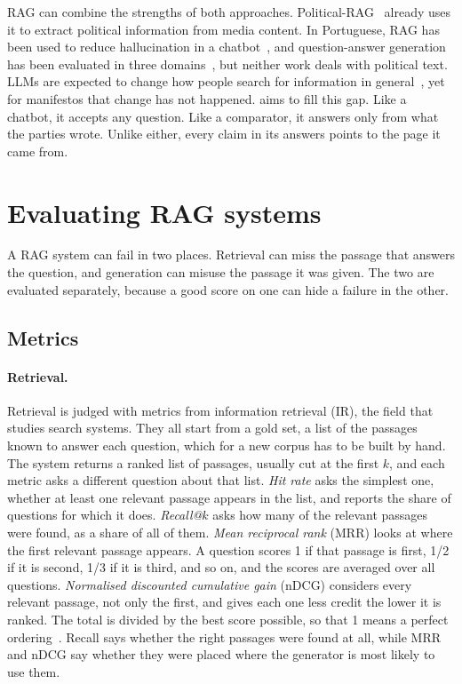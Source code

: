 RAG can combine the strengths of both approaches. Political-RAG~\citep{political-rag} already uses it to extract political information from media content. In Portuguese, RAG has been used to reduce hallucination in a chatbot~\citep{rag-chatbot}, and question-answer generation has been evaluated in three domains~\citep{paula-etal-2024-evaluation}, but neither work deals with political text. LLMs are expected to change how people search for information in general~\citep{llm-future}, yet for manifestos that change has not happened. \sysname{} aims to fill this gap. Like a chatbot, it accepts any question. Like a comparator, it answers only from what the parties wrote. Unlike either, every claim in its answers points to the page it came from.

\section{Evaluating RAG systems} \label{sec:sota-evaluate}

A RAG system can fail in two places. Retrieval can miss the passage that answers the question, and generation can misuse the passage it was given. The two are evaluated separately, because a good score on one can hide a failure in the other.

\subsection{Metrics} \label{subsec:sota-metrics}

\paragraph{Retrieval.} Retrieval is judged with metrics from information retrieval (IR), the field that studies search systems. They all start from a gold set, a list of the passages known to answer each question, which for a new corpus has to be built by hand. The system returns a ranked list of passages, usually cut at the first $k$, and each metric asks a different question about that list. \emph{Hit rate} asks the simplest one, whether at least one relevant passage appears in the list, and reports the share of questions for which it does. \emph{Recall@$k$} asks how many of the relevant passages were found, as a share of all of them. \emph{Mean reciprocal rank} (MRR) looks at where the first relevant passage appears. A question scores 1 if that passage is first, 1/2 if it is second, 1/3 if it is third, and so on, and the scores are averaged over all questions. \emph{Normalised discounted cumulative gain} (nDCG) considers every relevant passage, not only the first, and gives each one less credit the lower it is ranked. The total is divided by the best score possible, so that 1 means a perfect ordering~\citep{jarvelin2002ndcg}. Recall says whether the right passages were found at all, while MRR and nDCG say whether they were placed where the generator is most likely to use them.

